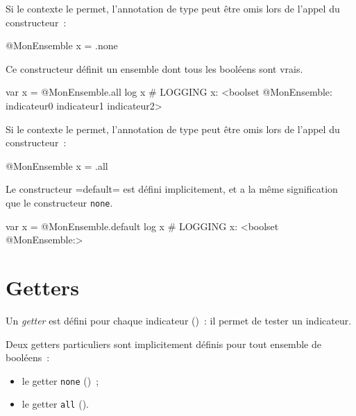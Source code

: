 Si le contexte le permet, l'annotation de type peut être omis lors de l'appel du constructeur~:
\begin{galgas}
@MonEnsemble x = .none
\end{galgas}



Ce constructeur définit un ensemble dont tous les booléens sont vrais.

\begin{galgas}
var x = @MonEnsemble.all
log x # LOGGING x: <boolset @MonEnsemble: indicateur0 indicateur1 indicateur2>
\end{galgas}

Si le contexte le permet, l'annotation de type peut être omis lors de l'appel du constructeur~:
\begin{galgas}
@MonEnsemble x = .all
\end{galgas}



Le constructeur \ggs=default= est défini implicitement, et a la même signification que le constructeur \texttt{none}.

\begin{galgas}
var x = @MonEnsemble.default
log x # LOGGING x: <boolset @MonEnsemble:>
\end{galgas}














\section{Getters}

Un \emph{getter} est défini pour chaque indicateur ()~: il permet de tester un indicateur.

Deux getters particuliers sont implicitement définis pour tout ensemble de booléens~:
\begin{itemize}
  \item le getter \texttt{none} ()~;
  \item le getter \texttt{all} ().
\end{itemize}

